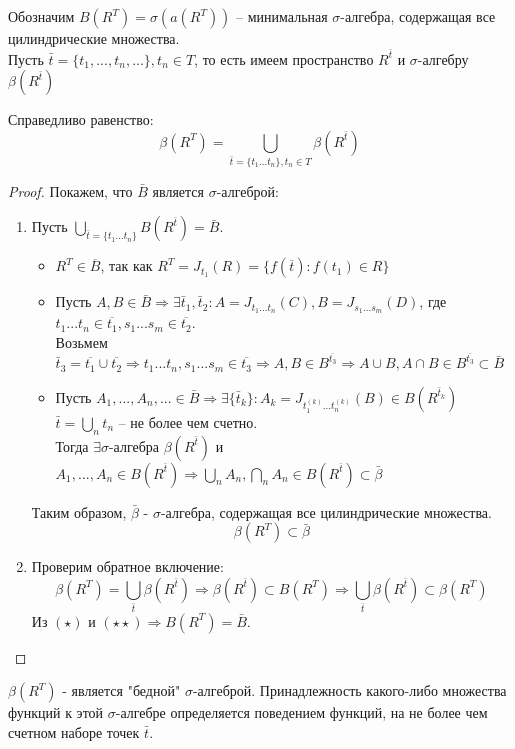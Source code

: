 Обозначим $B(R^T) = \sigma(a(R^T))$ -- минимальная $\sigma$-алгебра, содержащая все цилиндрические множества.\\
Пусть $\bar{t} = \{t_1,..., t_{n},...\}, t_{n} \in T$, то есть имеем пространство $R^{\bar{t}}$ и $\sigma$-алгебру $\beta (R^{\bar{t}})$
\begin{theorem}
Справедливо равенство:
$$\beta (R^{T}) = \bigcup\limits_{\bar{t} = \{t_{1}...t_{n}\}, t_{n}\in T} \beta (R^{\bar{t}})$$
\end{theorem}
\begin{proof}
Покажем, что $\bar{B}$ является $\sigma$-алгеброй:
\begin{enumerate}
\item Пусть $\bigcup\limits_{\bar{t} = \{t_{1}...t_{n}\}} B(R^{\bar{t}}) = \bar{B}$.
\begin{itemize}
\item $R^{T}\in \overline{B}$, так как $R^{T} = J_{t_{1}}(R) = \{f(\overline{t}):f(t_{1})\in R\}$
\item Пусть $A, B \in \bar{B} \Rightarrow \exists \bar{t}_1, \bar{t}_2: A = J_{t_{1}...t_{n}}(C), B = J_{s_{1}...s_{m}}(D)$, где $t_{1}...t_{n} \in \overline{t_{1}}, s_{1}...s_{m} \in \overline{t_{2}}$.\\
Возьмем $\bar{t}_3 = \overline{t_{1}} \cup \overline{t_{2}} \Rightarrow t_{1}...t_{n}, s_{1}...s_{m} \in \overline{t_{3}} \Rightarrow A, B \in B^{\overline{t_{3}}} \Rightarrow A\cup B, A\cap B \in B^{\overline{t_{3}}} \subset \bar{B}$
\item Пусть $A_1,..., A_n,... \in\bar{B} \Rightarrow \exists  \{\bar{t}_k\}: A_k = J_{t_{1}^{(k)}...t_{n}^{(k)}} (B) \in B(R^{\bar{t}_k})$\\
$\bar{t} = \bigcup\limits_{n} t_{n}$ -- не более чем счетно.\\
Тогда $\exists \sigma$-алгебра $\beta (R^{\bar{t}})$ и $A_{1},..., A_{n} \in B(R^{\bar{t}}) \Rightarrow \bigcup\limits_{n} A_{n}, \bigcap\limits_{n} A_{n}\in B(R^{\bar{t}}) \subset \bar{\beta}$
\end{itemize}
Таким образом, $\bar{\beta}$ - $\sigma$-алгебра, содержащая все цилиндрические множества.
\begin{equation}
\tag{$\star$}
\beta(R^T) \subset \bar{\beta}
\end{equation}
\item Проверим обратное включение:
\begin{equation}
\tag{$\star \star$}
\beta (R^T) = \bigcup\limits_{\bar{t}} \beta(R^{\bar{t}}) \Rightarrow
\beta(R^{\bar{t}}) \subset B(R^T) \Rightarrow \bigcup\limits_{\bar{t}} \beta(R^{\bar{t}}) \subset \beta(R^T)
\end{equation}
Из $(\star)$ и $(\star \star) \Rightarrow B(R^{T}) = \bar{B}$.
\end{enumerate}
\end{proof}
\begin{remark}
$\beta (R^{T})$ - является "бедной" $\sigma$-алгеброй. Принадлежность какого-либо множества функций к этой $\sigma$-алгебре определяется поведением функций, на не более чем счетном наборе точек $\bar{t}$.
\end{remark}
